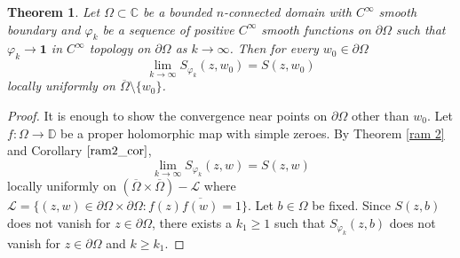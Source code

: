 \documentclass[11pt, reqno]{amsart}
\newtheorem{thm}{Theorem}[section]
\numberwithin{equation}{section}
\begin{document}
\begin{thm}\label{main}
Let $\Omega\subset\mathbb{C}$ be a bounded $n$-connected domain with $C^{\infty}$ smooth boundary and $\varphi_k$ be a sequence of positive $C^{\infty}$ smooth functions on $\partial\Omega$ such that $\varphi_k\rightarrow \mathbf{1}$ in $C^{\infty}$ topology on $\partial\Omega$ as $k\rightarrow\infty$. Then for every $w_0\in\partial\Omega$
\[
\lim_{k\rightarrow\infty}S_{\varphi_k}(z,w_0) = S(z,w_0)
\]
locally uniformly on $\overline{\Omega}\setminus\{w_0\}$. 
\end{thm}

\begin{proof}
It is enough to show the convergence near points on $\partial\Omega$ other than $w_0$. Let $f:\Omega\rightarrow\mathbb{D}$ be a proper holomorphic map with simple zeroes. By Theorem \ref{ram 2} and Corollary $\ref{ram2_cor}$,
\begin{equation}\label{con1}
\lim_{k\rightarrow\infty}S_{\varphi_k}(z,w) = S(z,w)
\end{equation}
locally uniformly on $(\overline{\Omega}\times\overline{\Omega})- \mathcal{L}$ where $\mathcal{L}=\{(z,w)\in\partial\Omega\times\partial\Omega : f(z) \overline{f(w)}=1\}$. Let $b\in\Omega$ be fixed. Since $S(z,b)$ does not vanish for $z\in\partial\Omega$, there exists a $k_1 \ge 1$ such that $S_{\varphi_k}(z,b)$ does not vanish for $z\in\partial\Omega$ and $k\geq k_1$.

\medskip


\end{proof}
\end{document}
